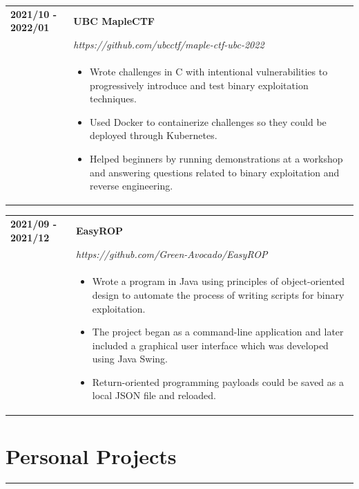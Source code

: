 \documentclass[letterpaper]{article}
\newcommand{\sect}[1]{\section*{#1}
                        {\color{cyan}
                        \rule{\textwidth}{1pt}
                        \vspace{-1ex}}}
\begin{document}
        \begin{tabular}{p{} p{}}
            \textbf{2021/10 - 2022/01} & \textbf{UBC MapleCTF} \\
            & \emph{https://github.com/ubcctf/maple-ctf-ubc-2022} \\
            & \begin{itemize}
                \item Wrote challenges in C with intentional vulnerabilities to progressively introduce
                    and test binary exploitation techniques.
                \item Used Docker to containerize challenges so they could be deployed through Kubernetes.
                \item Helped beginners by running demonstrations at a workshop and answering questions
                    related to binary exploitation and reverse engineering.
            \end{itemize}
            \\
        \end{tabular}

        \begin{tabular}{p{} p{}}
            \textbf{2021/09 - 2021/12} & \textbf{EasyROP} \\
            & \emph{https://github.com/Green-Avocado/EasyROP} \\
            & \begin{itemize}
                \item Wrote a program in Java using principles of object-oriented design to automate
                    the process of writing scripts for binary exploitation.
                \item The project began as a command-line application and later included a graphical user
                    interface which was developed using Java Swing.
                \item Return-oriented programming payloads could be saved as a local JSON file and
                    reloaded.
            \end{itemize}
            \\
        \end{tabular}

    \sect{Personal Projects}
\end{document}
